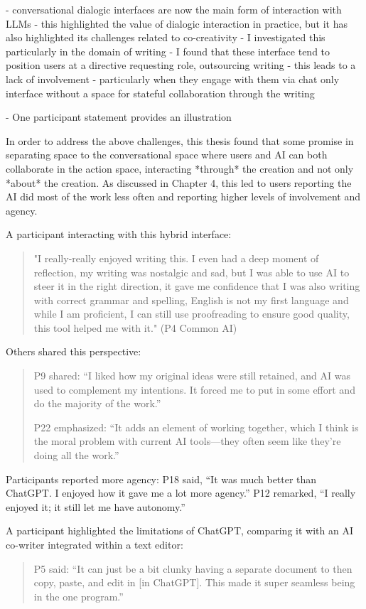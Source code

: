 - conversational dialogic interfaces are now the main form of interaction with LLMs
- this highlighted the value of dialogic interaction in practice, but it has also highlighted its challenges related to co-creativity
- I investigated this particularly in the domain of writing
- I found that these interface tend to position users at a directive requesting role, outsourcing writing 
- this leads to a lack of involvement
- particularly when they engage with them via chat only interface without a space for stateful collaboration through the writing

- One participant statement provides an illustration


In order to address the above challenges, this thesis found that some promise in separating space to the conversational space where users and AI can both collaborate in the action space, interacting *through* the creation and not only *about* the creation. As discussed in Chapter 4, this led to users reporting the AI did most of the work less often and reporting higher levels of involvement and agency. 

A participant interacting with this hybrid interface:
\begin{quote}
"I really-really enjoyed writing this. I even had a deep moment of reflection, my writing was nostalgic and sad, but I was able to use AI to steer it in the right direction, it gave me confidence that I was also writing with correct grammar and spelling, English is not my first language and while I am proficient, I can still use proofreading to ensure good quality, this tool helped me with it." (P4 Common AI)
\end{quote}
Others shared this perspective:
\begin{quote}
P9 shared: “I liked how my original ideas were still retained, and AI was used to complement my intentions. It forced me to put in some effort and do the majority of the work.”

P22 emphasized: “It adds an element of working together, which I think is the moral problem with current AI tools—they often seem like they’re doing all the work.”

\end{quote}


Participants reported more agency: P18 said, “It was much better than ChatGPT. I enjoyed how it gave me a lot more agency.” P12 remarked, “I really enjoyed it; it still let me have autonomy.”

A participant highlighted the limitations of ChatGPT, comparing it with an AI co-writer integrated within a text editor:
\begin{quote}
P5 said: “It can just be a bit clunky having a separate document to then copy, paste, and edit in [in ChatGPT]. This made it super seamless being in the one program.”
\end{quote}



